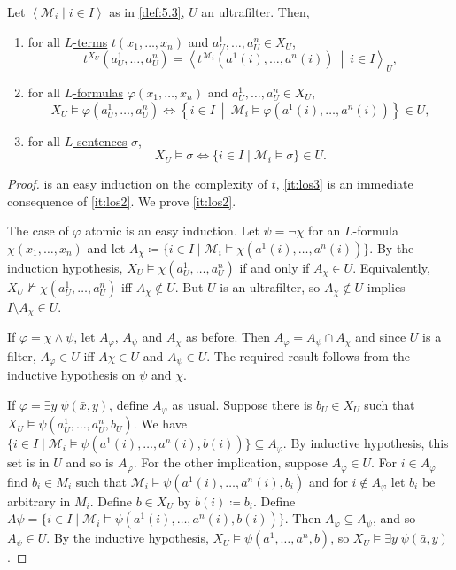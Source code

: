 \documentclass{article}
\let\models\vDash
\begin{document}
\begin{nthm}[Łoś] \label{thm:5.7} 
Let $\left< \mathcal{M}_i \mid i \in I \right>$ as in \cref{def:5.3}, $U$ an ultrafilter. Then,
\begin{enumerate}[label=(\roman*)]
\item for all \hyperlink{def:lterm}{$L$-terms} $t(x_1, \dots, x_n)$ and $a_U^1, \dots, a_U^n \in X_U$, \label{it:los1}
\[
t^{X_U}(a_U^1, \dots, a_U^n) = \left< t^{\mathcal{M}_i} (a^1(i), \dots, a^n(i)) \ \middle|\ i \in I \right>_U,
\] 
\item for all \hyperlink{def:form}{$L$-formulas} $\varphi(x_1, \dots, x_n)$ and $a_U^1, \dots, a_U^n \in X_U$, \label{it:los2}
\[
X_U \models \varphi(a_U^1, \dots, a_U^n) \iff \left\{ i \in I \ \middle|\ \mathcal{M}_i \models \varphi(a^1(i), \dots,  a^n(i)) \right\} \in U,
\] 
\item for all \hyperlink{def:sentence}{$L$-sentences} $\sigma$,  \label{it:los3}
\[
X_U \models \sigma \iff \{i \in I \mid \mathcal{M}_i \models \sigma \} \in U.
\] 
\end{enumerate}
\end{nthm}
\begin{proof}
 is an easy induction on the complexity of $t$, \cref{it:los3} is an immediate consequence of \cref{it:los2}. We prove \cref{it:los2}.

The case of $\varphi$ atomic is an easy induction. Let $\psi = \neg \chi$ for an $L$-formula $\chi(x_1, \dots, x_n)$ and let $A_\chi \coloneqq \{i \in I \mid \mathcal{M}_i \models \chi(a^1(i), \dots, a^n(i))\}$. By the induction hypothesis, $X_U \models \chi(a_U^1, \dots, a_U^n)$ if and only if $A_\chi \in U$. Equivalently, $X_U \not\models \chi(a_U^1, \dots, a_U^n)$ iff $A_\chi \not\in U$. But $U$ is an ultrafilter, so $A_\chi \not\in U$ implies $I \setminus A_\chi \in U$.

If $\varphi = \chi \land \psi$, let $A_\varphi$, $A_\psi$ and $A_\chi$ as before. Then $A_\varphi = A_\psi \cap A_\chi$ and since $U$ is a filter, $A_\varphi \in U$ iff $A\chi \in U$ and $A_\psi \in U$. The required result follows from the inductive hypothesis on $\psi$ and $\chi$.

If $\varphi = \exists y \; \psi(\bar x, y)$, define $A_\varphi$ as usual. Suppose there is $b_U \in X_U$ such that $X_U \models \psi(a_U^1, \dots, a_U^n, b_U)$. We have $\{i \in I \mid \mathcal{M}_i \models \psi(a^1(i), \dots, a^n(i),b(i))\} \subseteq A_\varphi$. By inductive hypothesis, this set is in $U$ and so is $A_\varphi$. For the other implication, suppose $A_\varphi \in U$. For $i \in A_\varphi$ find $b_i \in M_i$ such that $\mathcal{M}_i \models \psi(a^1(i), \dots, a^n(i), b_i)$ and for $i \not\in A_\varphi$ let $b_i$ be arbitrary in $M_i$. Define $b \in X_U$ by $b(i) \coloneqq b_i$. Define $A \psi = \{i \in I \mid \mathcal{M}_i \models \psi(a^1(i), \dots, a^n(i),b(i))\}$. Then $A_\varphi \subseteq A_\psi$, and so $A_\psi \in U$. By the inductive hypothesis, $X_U \models  \psi(a^1, \dots, a^n, b)$, so $X_U \models \exists y \; \psi(\bar a, y)$.
\end{proof}
\end{document}
